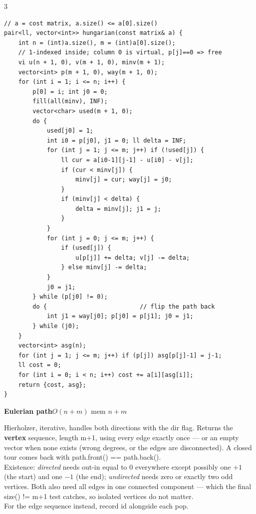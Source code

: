 \documentclass[9pt,a4paper]{extarticle}
\newcommand{\entry}[3]{%
  \addcontentsline{toc}{subsection}{#1}%
  \vspace{0.8ex}%
  \noindent\colorbox{hdbg}{\parbox{\dimexpr\columnwidth-2\fboxsep}{%
    \strut\textbf{#1}\hfill{\footnotesize\textsf{#2}}}}\par
  \vspace{0.4ex}%
  {\footnotesize #3\par}%
}
\newcommand{\code}[1]{{\ttfamily\small #1}}
\begin{document}
\begin{multicols*}{3}
\begin{lstlisting}
// a = cost matrix, a.size() <= a[0].size()
pair<ll, vector<int>> hungarian(const matrix& a) {
    int n = (int)a.size(), m = (int)a[0].size();
    // 1-indexed inside; column 0 is virtual, p[j]==0 => free
    vi u(n + 1, 0), v(m + 1, 0), minv(m + 1);
    vector<int> p(m + 1, 0), way(m + 1, 0);
    for (int i = 1; i <= n; i++) {
        p[0] = i; int j0 = 0;
        fill(all(minv), INF);
        vector<char> used(m + 1, 0);
        do {
            used[j0] = 1;
            int i0 = p[j0], j1 = 0; ll delta = INF;
            for (int j = 1; j <= m; j++) if (!used[j]) {
                ll cur = a[i0-1][j-1] - u[i0] - v[j];
                if (cur < minv[j]) {
                    minv[j] = cur; way[j] = j0;
                }
                if (minv[j] < delta) {
                    delta = minv[j]; j1 = j;
                }
            }
            for (int j = 0; j <= m; j++) {
                if (used[j]) {
                    u[p[j]] += delta; v[j] -= delta;
                } else minv[j] -= delta;
            }
            j0 = j1;
        } while (p[j0] != 0);
        do {                          // flip the path back
            int j1 = way[j0]; p[j0] = p[j1]; j0 = j1;
        } while (j0);
    }
    vector<int> asg(n);
    for (int j = 1; j <= m; j++) if (p[j]) asg[p[j]-1] = j-1;
    ll cost = 0;
    for (int i = 0; i < n; i++) cost += a[i][asg[i]];
    return {cost, asg};
}
\end{lstlisting}

\entry{Eulerian path}{$O(n + m)$ \quad mem $n + m$}{%
Hierholzer, iterative, handles both directions with the \code{dir} flag. Returns the
\textbf{vertex} sequence, length \code{m+1}, using every edge exactly once --- or an
empty vector when none exists (wrong degrees, or the edges are disconnected). A closed
tour comes back with \code{path.front() == path.back()}.\\[0.3ex]
Existence: \emph{directed} needs \code{out-in} equal to 0 everywhere except possibly one
$+1$ (the start) and one $-1$ (the end); \emph{undirected} needs zero or exactly two odd
vertices. Both also need all edges in one connected component --- which the final
\code{size() != m+1} test catches, so isolated vertices do not matter.\\[0.3ex]
For the edge sequence instead, record \code{id} alongside each pop.}


\end{multicols*}
\end{document}
